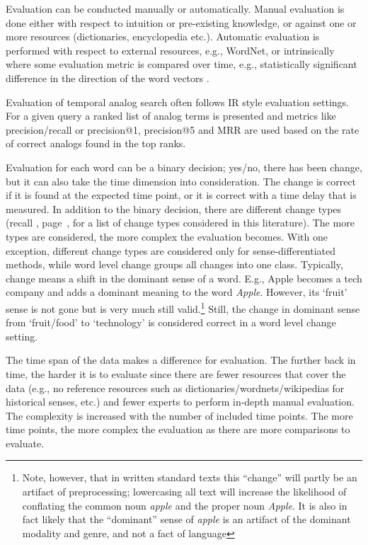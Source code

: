 \documentclass[output=paper]{langsci/langscibook}
\begin{document}
 Evaluation can be conducted manually or automatically. Manual evaluation is done either with respect to intuition or pre-existing knowledge, or against one or more resources (dictionaries, encyclopedia etc.). Automatic evaluation is performed with respect to external resources, e.g., WordNet, or intrinsically where some evaluation metric is compared over time, e.g., statistically significant difference in the direction of the word vectors \citep{kulkarni2015statistically}. 

Evaluation of temporal analog search often follows IR style evaluation settings. For a given query a ranked list of analog terms is presented and metrics like precision/recall \citep{tahmasebi2012neer} or precision@1, precision@5 and MRR \citep{zhang2016past} are used based on the rate of correct analogs found in the top ranks.
	
	Evaluation for each word can be a binary decision; yes/no, there has been change, but it can also take the time dimension into consideration. The change is correct if it is found at the expected time point, or it is correct with a time delay that is measured. In addition to the binary decision, there are different change types (recall , page~\pageref{tab:changetypes}, for a list of change types considered in this literature). The more types are considered, the more complex the evaluation becomes. With one exception, different change types are considered only for sense-differentiated methods, while word level change groups all changes into one class. Typically, change means a shift in the dominant sense of a word. E.g., Apple becomes a tech company and adds a dominant meaning to the word \emph{Apple}. However, its `fruit' sense is not gone but is very much still valid.\footnote{Note, however, that in written standard texts this ``change'' will partly be an artifact of preprocessing; lowercasing all text will increase the likelihood of conflating the common noun \emph{apple} and the proper noun \emph{Apple}. It is also in fact likely that the ``dominant'' sense of \emph{apple} is an artifact of the dominant modality and genre, and not a fact of language} Still, the change in dominant sense from `fruit/food' to `technology' is considered correct in a word level change setting. 
    

	The time span of the data makes a difference for evaluation. The further back in time, the harder it is to evaluate since there are fewer resources that cover the data (e.g., no reference resources such as dictionaries/wordnets/wikipedias for historical senses, etc.) and fewer experts to perform in-depth manual evaluation. The complexity is increased with the number of included time points. The more time points, the more complex the evaluation as there are more comparisons to evaluate. 
	
\end{document}
